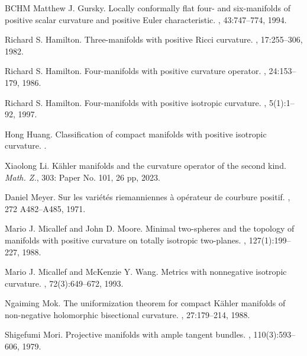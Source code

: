 \documentclass[12pt]{amsart}
\theoremstyle{plain}
\theoremstyle{definition}
\renewcommand{\>}{\rightarrow}
\numberwithin{equation}{section} %
\begin{document}
\begin{thebibliography}{BCHM}
	Matthew J. Gursky. 
	\newblock Locally conformally flat four- and six-manifolds of positive scalar curvature and positive Euler characteristic. 
	, 43:747--774, 1994.
	
	Richard S. Hamilton.
	\newblock Three-manifolds with positive Ricci curvature. 
	, 17:255--306, 1982.
	
	Richard S. Hamilton. 
	\newblock Four-manifolds with positive curvature operator. 
	, 24:153--179, 1986.
	
	Richard S. Hamilton. 
	\newblock Four-manifolds with positive isotropic curvature. 
	, 5(1):1--92, 1997.
	
	Hong Huang. 
	\newblock Classification of compact manifolds with positive isotropic curvature. 
	.
	
	
	 Xiaolong Li.
K\"ahler manifolds and the curvature operator of the second kind. {\emph{Math. Z.}},  303: Paper No. 101, 26 pp, 2023.
	
	Daniel  Meyer.
	\newblock Sur les vari\'{e}t\'{e}s riemanniennes \`{a} op\'{e}rateur de courbure positif. 
	, 272 A482--A485, 1971.
	
	Mario J. Micallef and John D. Moore.
	\newblock Minimal two-spheres and the topology of manifolds with positive curvature on totally isotropic two-planes.
	, 127(1):199--227, 1988.
	
	Mario J. Micallef and McKenzie Y. Wang.  
	\newblock Metrics with nonnegative isotropic curvature.
	, 72(3):649--672, 1993.
	
	Ngaiming Mok. 
	\newblock The uniformization theorem for compact K\"ahler manifolds of non-negative holomorphic bisectional curvature. 
	, 27:179--214, 1988.
	
	Shigefumi Mori. 
	\newblock Projective manifolds with ample tangent bundles.
	, 110(3):593--606, 1979.
	


\end{thebibliography}
\end{document}

